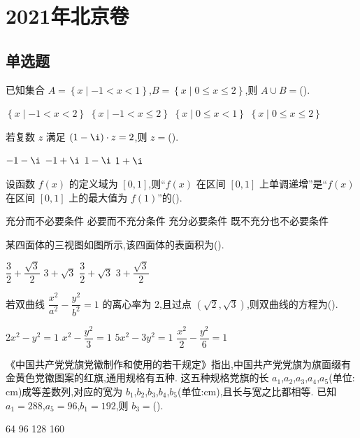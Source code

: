 \chapter{2021年北京卷}

\section{单选题}

\begin{problem}
已知集合 \(A=\left\{x\mid -1<x<1\right\}\),\(B=\left\{x\mid 0\le x\le2\right\}\),则 \(A\cup B=\)(\quad).

\choices
    {\(\left\{x\mid -1<x<2\right\}\)}
    {\(\left\{x\mid -1<x\le2\right\}\)}
    {\(\left\{x\mid 0\le x<1\right\}\)}
    {\(\left\{x\mid 0\le x\le2\right\}\)}
\end{problem}

\begin{problem}
若复数 \(z\) 满足 \((1-\i)\cdot z=2\),则 \(z=\)(\quad).

\choices
    {\(-1-\i\)}
    {\(-1+\i\)}
    {\(1-\i\)}
    {\(1+\i\)}
\end{problem}

\begin{problem}
设函数 \(f(x)\) 的定义域为 \([0,1]\),则``\(f(x)\) 在区间 \([0,1]\) 上单调递增''是``\(f(x)\) 在区间 \([0,1]\) 上的最大值为 \(f(1)\)''的(\quad).

\choices
    {充分而不必要条件}
    {必要而不充分条件}
    {充分必要条件}
    {既不充分也不必要条件}
\end{problem}

\begin{problem}
某四面体的三视图如图所示,该四面体的表面积为(\quad).


\choices
    {\(\dfrac{3}{2}+\dfrac{\sqrt3}{2}\)}
    {\(3+\sqrt3\)}
    {\(\dfrac{3}{2}+\sqrt3\)}
    {\(3+\dfrac{\sqrt3}{2}\)}
\end{problem}

\begin{problem}
若双曲线 \(\dfrac{x^2}{a^2}-\dfrac{y^2}{b^2}=1\) 的离心率为 \(2\),且过点 \((\sqrt2,\sqrt3)\),则双曲线的方程为(\quad).

\choices
    {\(2x^2-y^2=1\)}
    {\(x^2-\dfrac{y^2}{3}=1\)}
    {\(5x^2-3y^2=1\)}
    {\(\dfrac{x^2}{2}-\dfrac{y^2}{6}=1\)}
\end{problem}

\begin{problem}
《中国共产党党旗党徽制作和使用的若干规定》指出,中国共产党党旗为旗面缀有金黄色党徽图案的红旗,通用规格有五种. 这五种规格党旗的长 \(a_1\),\(a_2\),\(a_3\),\(a_4\),\(a_5\)(单位:\(\mathrm{cm}\))成等差数列,对应的宽为 \(b_1\),\(b_2\),\(b_3\),\(b_4\),\(b_5\)(单位:\(\mathrm{cm}\)),且长与宽之比都相等. 已知 \(a_1=288\),\(a_5=96\),\(b_1=192\),则 \(b_3=\)(\quad).

\choices
    {64}
    {96}
    {128}
    {160}
\end{problem}

